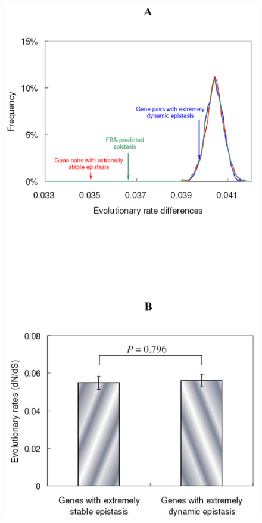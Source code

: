 \documentclass{article}
\begin{document}
\begin{figure}[H]
\caption{}
\label{fig:eef5}
\centering
\includegraphics[height=0.95\textheight]{envFigure_5}
\end{figure}
\end{document}
